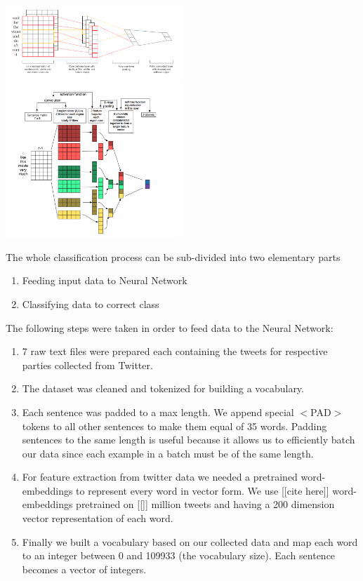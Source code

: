 \documentclass[10pt, oneside]{article}
\begin{document}
\begin{multicols}{2}
\includegraphics[width=0.5\textwidth]{images/cnn_architecture1.png}
\includegraphics[width=0.5\textwidth]{images/cnn_architecture2.png}




The whole classification process can be sub-divided into two elementary parts
\begin{enumerate}
\item Feeding input data to Neural Network
\item Classifying data to correct class
\end{enumerate}
The following steps were taken in order to feed data to the Neural Network:
\begin{enumerate}
\item 7 raw text files were prepared each containing the tweets for respective parties collected from Twitter.
\item The dataset was cleaned and tokenized for building a vocabulary.
\item Each sentence was padded to a max length. We append special $<$PAD$>$ tokens to all other sentences to make them equal of 35 words. Padding sentences to the same length is useful because it allows us to efficiently batch our data since each example in a batch must be of the same length.
\item For feature extraction from twitter data we needed a pretrained word-embeddings to represent every word in vector form. We use [[cite here]] word-embeddings pretrained on [[]] million tweets and having a 200 dimension vector representation of each word.  
\item Finally we built a vocabulary based on our collected data and map each word to an integer between 0 and 109933 (the vocabulary size). Each sentence becomes a vector of integers.
\end{enumerate}


\end{multicols}
\end{document}
